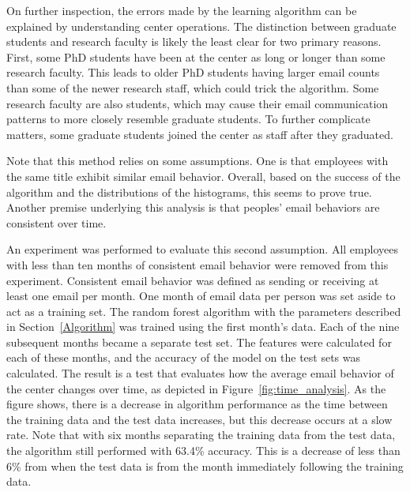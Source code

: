 \documentclass[12pt]{report}
\begin{document}
On further inspection, the errors made by the learning algorithm can be explained by understanding center operations.
The distinction between graduate students and research faculty is likely the least clear for two primary reasons.
First, some PhD students have been at the center as long or longer than some research faculty.
This leads to older PhD students having larger email counts than some of the newer research staff, which could trick the algorithm.
Some research faculty are also students, which may cause their email communication patterns to more closely resemble graduate students. 
To further complicate matters, some graduate students joined the center as staff after they graduated.

Note that this method relies on some assumptions.
One is that employees with the same title exhibit similar email behavior.
Overall, based on the success of the algorithm and the distributions of the histograms, this seems to prove true.
Another premise underlying this analysis is that peoples' email behaviors are consistent over time.

An experiment was performed to evaluate this second assumption.
All employees with less than ten months of consistent email behavior were removed from this experiment.
Consistent email behavior was defined as sending or receiving at least one email per month.
One month of email data per person was set aside to act as a training set.
The random forest algorithm with the parameters described in Section~\ref{Algorithm} was trained using the first month's data.
Each of the nine subsequent months became a separate test set.
The features were calculated for each of these months, and the accuracy of the model on the test sets was calculated.
The result is a test that evaluates how the average email behavior of the center changes over time, as depicted in Figure~\ref{fig:time_analysis}.
As the figure shows, there is a decrease in algorithm performance as the time between the training data and the test data increases, but this decrease occurs at a slow rate.
Note that with six months separating the training data from the test data, the algorithm still performed with 63.4\% accuracy.
This is a decrease of less than 6\% from when the test data is from the month immediately following the training data.
\end{document}
